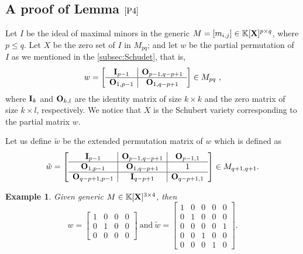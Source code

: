 \documentclass[11pt]{article}
\numberwithin{Property}{section}
\numberwithin{Theorem}{section}
\numberwithin{Proposition}{section}
\numberwithin{Lemma}{section}
\numberwithin{Corollary}{section}
\numberwithin{Definition}{section}
\numberwithin{Remark}{section}
\numberwithin{Conjecture}{section}
\numberwithin{Problem}{section}
\newtheorem{Example}{Example}%
\numberwithin{Example}{section}
\numberwithin{Claim}{section}
\renewcommand{\leq}{\leqslant}
\newcommand{\field}{\mathbb{K}} %
\newcommand{\mat}[1]{\mathbf{\MakeUppercase{#1}}} %
\newcommand{\improve}[1]{\textcolor{blue}{#1}} %
\begin{document}
\subsection{A proof of Lemma $\ref{P4}$}

Let $I$ be the ideal of maximal minors in the generic $M = [m_{i,j}] \in \field[\mat{X}]^{p \times q}$, where $p \leq q$. Let $X$ be the zero set of $I$ in $M_{pq}$; and let $w$ be the partial permutation of $I$ as we mentioned in the  \improve{\cref{subsec:Schudet}}, that is, 
$$w = 
\left[\begin{array}{c |c}%
\mat{I}_{p-1} & \mat{O}_{p-1, q-p+1} \\  \hline
\mat{O}_{1,p-1} & \mat{O}_{1, q-p+1}\\
\end{array}
\right] \in M_{pq} \ ,$$
where $\mat{I}_{k}$ and $\mat{O}_{k,l}$ are the identity matrix of size $k \times k$ and the zero matrix of size $k \times l$, respectively. We notice that $X$ is the Schubert variety corresponding to the partial matrix $w$. 

Let us define $\tilde{w}$ be the extended permutation matrix of $w$ which is defined as 
\[ \tilde{w} = 
\left[\begin{array}{c |c|c}%
\mat{I}_{p-1} & \mat{O}_{p-1, q-p+1}& \mat{O}_{p-1,1} \\  \hline
\mat{O}_{1,p-1} & \mat{O}_{1, q-p+1} & 1\\
\hline
\mat{O}_{q-p+1,p-1} & \mat{I}_{q-p+1} & \mat{O}_{q-p+1,1} \\ %
\end{array} \right] \in M_{q+1, q+1}. 
\]
\begin{Example} Given generic $M \in \field[\mat{X}]^{3\times 4}$, then $$w = \left[ \begin{matrix}
1 & 0 & 0 & 0  \\
0 & 1 & 0 & 0  \\
0 & 0 & 0 & 0  
\end{matrix}\right] \ \mathrm{and} \  \tilde{w} = \left[ \begin{matrix}
1 & 0 & 0 & 0  & 0 \\
0 & 1 & 0 & 0  & 0\\
0 & 0 & 0 & 0  & 1 \\
0 & 0 & 1 & 0  & 0 \\
0 & 0 & 0 & 1  & 0 
\end{matrix}\right]. $$
\end{Example}
\end{document}
